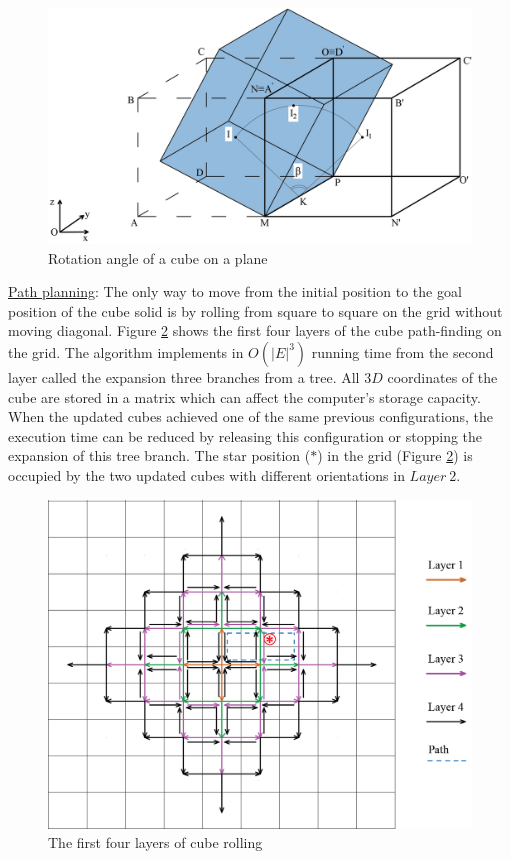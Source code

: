 \begin{figure}[H]
\centering
	\includegraphics[width=1\textwidth]{image/cubeGeo1.png}
	\caption{Rotation angle of a cube on a plane}
	\label{fig:cubeGeo1}
\end{figure}

\noindent\uline{Path planning}: 
The only way to move from the initial position to the goal position of the cube solid is by rolling from square to square on the grid without moving diagonal. 
Figure \ref{fig:cubeLayer} shows the first four layers of the cube path-finding on the grid. 
The algorithm implements in $O(|E|^3)$ running time from the second layer called the expansion three branches from a tree. 
All $3D$ coordinates of the cube are stored in a matrix which can affect the computer's storage capacity. 
When the updated cubes achieved one of the same previous configurations, the execution time can be reduced by releasing this configuration or stopping the expansion of this tree branch.
The star position ($*$) in the grid (Figure \ref{fig:cubeLayer}) is occupied by the two updated cubes with different orientations in $Layer\ 2$. \\

\begin{figure}[H]
\centering
	\includegraphics[width=1\textwidth]{image/cubePath00.png}
	\caption{The first four layers of cube rolling}
	\label{fig:cubeLayer}
\end{figure}
%

